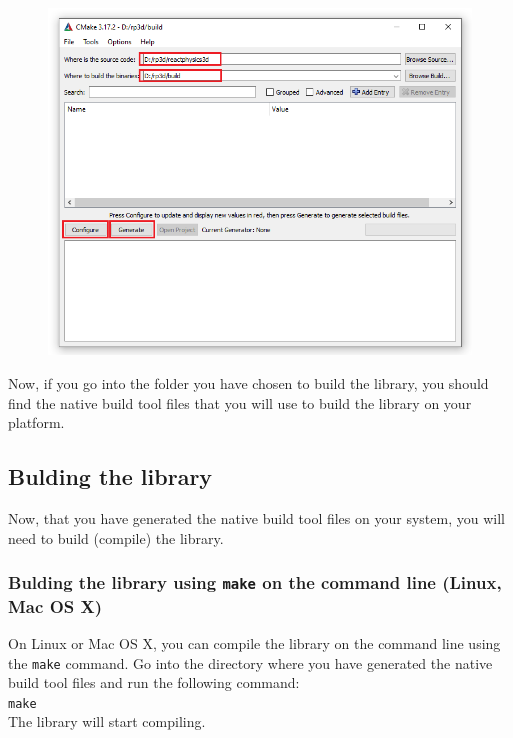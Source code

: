 \documentclass[a4paper,12pt]{article}
\begin{document}
    \begin{figure}[!ht]
        \centering
	\includegraphics[scale=0.7]{CMakeWin.png}
        \label{fig:cmakewin}
    \end{figure}

     Now, if you go into the folder you have chosen to build the library, you should find the native build tool files that you will use to build
     the library on your platform.

     \subsection{Bulding the library}

     Now, that you have generated the native build tool files on your system, you will need to build (compile) the library.

     \subsubsection{Bulding the library using \texttt{make} on the command line (Linux, Mac OS X)}

     On Linux or Mac OS X, you can compile the library on the command line using the \texttt{make} command. Go into the directory where you have generated the
     native build tool files and run the following command: \\

     \texttt{make} \\

     The library will start compiling. 
\end{document}
